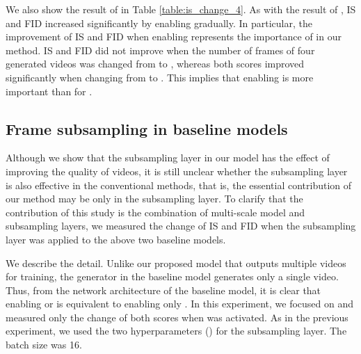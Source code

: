 \documentclass[twocolumn]{svjour3}
\def\Table#1{Table \ref{table:#1}}
\begin{document}
We also show the result of  in \Table{is_change_4}.
As with the result of ,
IS and FID increased significantly by enabling  gradually.
In particular, the improvement of IS and FID when enabling 
represents the importance of  in our method.
IS and FID did not improve when the number of frames of four generated videos
was changed from  to ,
whereas both scores improved significantly
when changing from  to .
This implies that enabling  is more important than  for .
































\subsection{Frame subsampling in baseline models}













Although we show that the subsampling layer in our model has the effect of improving the quality of videos,
it is still unclear whether the subsampling layer is also effective in the conventional methods,
that is, the essential contribution of our method may be only in the subsampling layer.
To clarify that the contribution of this study is the combination of multi-scale model
and subsampling layers, we measured the change of IS and FID
when the subsampling layer was applied to the above two baseline models.

We describe the detail.
Unlike our proposed model that outputs multiple videos for training,
the generator in the baseline model generates only a single video.
Thus, from the network architecture of the baseline model,
it is clear that enabling  or  is equivalent to enabling only .
In this experiment, we focused on  and measured only the change of both scores
when  was activated.
As in the previous experiment, we used the two hyperparameters ()
for the subsampling layer. The batch size was 16.
\end{document}
